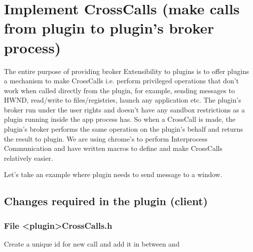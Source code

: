 \documentclass[letterpaper,12pt,english,openany,oneside]{sphinxmanual}
\begin{document}
\section{Implement CrossCalls (make calls from plug\sphinxhyphen{}in to plug\sphinxhyphen{}in’s broker process)}
\label{\detokenize{SandboxBrokerExt:implement-crosscalls-make-calls-from-plug-in-to-plug-in-s-broker-process}}
The entire purpose of providing broker Extensibility to plugins is to offer plug\sphinxhyphen{}ins a mechanism to make CrossCalls i.e. perform privileged operations that don’t work when called directly from the plug\sphinxhyphen{}in, for example, sending messages to HWND, read/write to files/registries, launch any application etc. The plug\sphinxhyphen{}in’s broker run under the user rights and doesn’t have any sandbox restrictions as a plugin running inside the app process has. So when a CrossCall is made, the plugin’s broker performs the same operation on the plugin’s behalf and returns the result to plugin. We are using chrome’s  to perform Inter\sphinxhyphen{}process Communication and have written macros to define and make CrossCalls relatively easier.

Let’s take an example where plugin needs to send  message to a window.


\subsection{Changes required in the plugin (client)}
\label{\detokenize{SandboxBrokerExt:changes-required-in-the-plugin-client}}

\subsubsection{File <plugin>CrossCalls.h}
\label{\detokenize{SandboxBrokerExt:file-plugin-crosscalls-h}}
Create a unique id for new call and add it in between  and 

\begin{sphinxVerbatim}[commandchars=\\\{\}]





\end{sphinxVerbatim}
\end{document}

